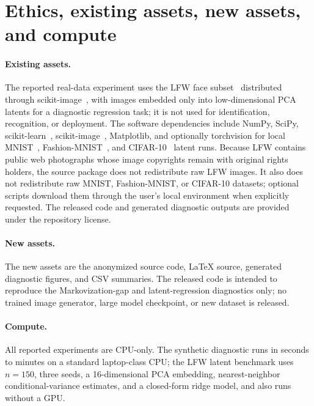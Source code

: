 \documentclass{article}
\numberwithin{equation}{section}
\begin{document}
\section{Ethics, existing assets, new assets, and compute}
\label{app:ethics_assets}

\paragraph{Existing assets.}
The reported real-data experiment uses the LFW face subset~\citep{huang2007lfw} distributed through scikit-image~\citep{vanderwalt2014skimage}, with images embedded only into low-dimensional PCA latents for a diagnostic regression task; it is not used for identification, recognition, or deployment. The software dependencies include NumPy, SciPy, scikit-learn~\citep{pedregosa2011sklearn}, scikit-image~\citep{vanderwalt2014skimage}, Matplotlib, and optionally torchvision for local MNIST~\citep{lecun1998mnist}, Fashion-MNIST~\citep{xiao2017fashionmnist}, and CIFAR-10~\citep{krizhevsky2009learning} latent runs. Because LFW contains public web photographs whose image copyrights remain with original rights holders, the source package does not redistribute raw LFW images. It also does not redistribute raw MNIST, Fashion-MNIST, or CIFAR-10 datasets; optional scripts download them through the user's local environment when explicitly requested. The released code and generated diagnostic outputs are provided under the repository license.

\paragraph{New assets.}
The new assets are the anonymized source code, LaTeX source, generated diagnostic figures, and CSV summaries. The released code is intended to reproduce the Markovization-gap and latent-regression diagnostics only; no trained image generator, large model checkpoint, or new dataset is released.

\paragraph{Compute.}
All reported experiments are CPU-only. The synthetic diagnostic runs in seconds to minutes on a standard laptop-class CPU; the LFW latent benchmark uses $n=150$, three seeds, a 16-dimensional PCA embedding, nearest-neighbor conditional-variance estimates, and a closed-form ridge model, and also runs without a GPU.
\end{document}

